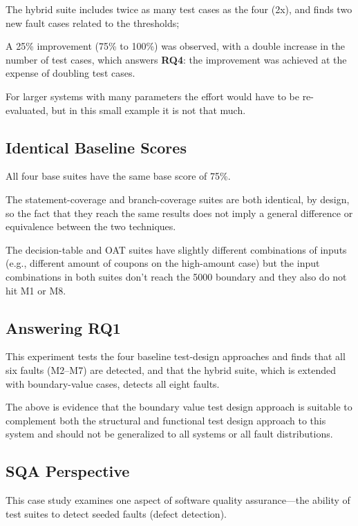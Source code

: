 \documentclass[conference]{IEEEtran}
\begin{document}
The hybrid suite includes twice as many test cases as the four (2x), and finds two new fault cases related to the thresholds;

A 25\% improvement (75\% to 100\%) was observed, with a double increase in the number of test cases, which answers \textbf{RQ4}: the improvement was achieved at the expense of doubling test cases.

For larger systems with many parameters the effort would have to be re-evaluated, but in this small example it is not that much.



\subsection{Identical Baseline Scores}

All four base suites have the same base score of 75\%.

The statement-coverage and branch-coverage suites are both identical, by design, so the fact that they reach the same results does not imply a general difference or equivalence between the two techniques.

The decision-table and OAT suites have slightly different combinations of inputs (e.g., different amount of coupons on the high-amount case) but the input combinations in both suites don't reach the 5000 boundary and they also do not hit M1 or M8.



\subsection{Answering RQ1}

This experiment tests the four baseline test-design approaches and finds that all six faults (M2--M7) are detected, and that the hybrid suite, which is extended with boundary-value cases, detects all eight faults.

The above is evidence that the boundary value test design approach is suitable to complement both the structural and functional test design approach to this system and should not be generalized to all systems or all fault distributions.



\subsection{SQA Perspective}

This case study examines one aspect of software quality assurance—the ability of test suites to detect seeded faults (defect detection).
\end{document}
